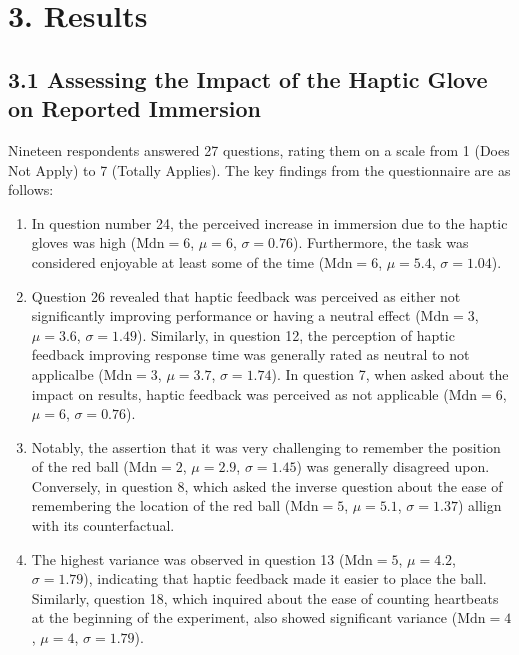 \documentclass[12pt,oneside,openright]{report}
\begin{document}
\section*{3. Results}
\subsection*{3.1 Assessing the Impact of the Haptic Glove on Reported Immersion}
    
Nineteen respondents answered 27 questions, rating them on a scale from 1 (Does Not Apply) to 7 (Totally Applies). The key findings from the questionnaire are as follows:
    
\begin{enumerate}
    \item In question number 24, the perceived increase in immersion due to the haptic gloves was high ($\text{Mdn} = 6$, $\mu = 6$, $\sigma = 0.76$). Furthermore, the task was considered enjoyable at least some of the time ($\text{Mdn} = 6$, $\mu = 5.4$, $\sigma = 1.04$).
        
    \item Question 26 revealed that haptic feedback was perceived as either not significantly improving performance or having a neutral effect ($\text{Mdn} = 3$, $\mu = 3.6$, $\sigma = 1.49$). Similarly, in question 12, the perception of haptic feedback improving response time was generally rated as neutral to not applicalbe ($\text{Mdn} = 3$, $\mu = 3.7$, $\sigma = 1.74$). In question 7, when asked about the impact on results, haptic feedback was perceived as not applicable ($\text{Mdn} = 6$, $\mu = 6$, $\sigma = 0.76$).
    
    \item Notably, the assertion that it was very challenging to remember the position of the red ball ($\text{Mdn} = 2$, $\mu = 2.9$, $\sigma = 1.45$) was generally disagreed upon. Conversely, in question 8, which asked the inverse question about the ease of remembering the location of the red ball ($\text{Mdn} = 5$, $\mu = 5.1$, $\sigma = 1.37$) allign with its counterfactual. 
    
    \item The highest variance was observed in question 13 ($\text{Mdn} = 5$, $\mu = 4.2$, $\sigma = 1.79$), indicating that haptic feedback made it easier to place the ball. Similarly, question 18, which inquired about the ease of counting heartbeats at the beginning of the experiment, also showed significant variance ($\text{Mdn} = 4$, $\mu = 4$, $\sigma = 1.79$). 
        
\end{enumerate}
    
\end{document}
